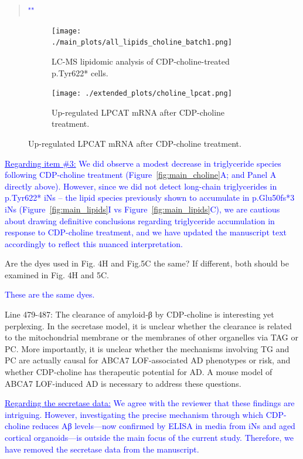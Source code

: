 \documentclass[12pt]{article}
\begin{document}
\begin{quote}
	\textcolor{blue}{"\quoteI"}
\end{quote}

\begin{figure}[H] 
\begin{subfigure}[t]{0.6\textwidth}
		\caption{LC-MS lipidomic analysis of CDP-choline-treated p.Tyr622* cells.}
		\texttt{[image: ./main\_plots/all\_lipids\_choline\_batch1.png]}        
	\end{subfigure}
	\begin{subfigure}[t]{0.4\textwidth}
		\caption{Up-regulated LPCAT mRNA after CDP-choline treatment.}
		\texttt{[image: ./extended\_plots/choline\_lpcat.png]}        
	\end{subfigure}
\end{figure}

\textcolor{blue}{\underline{Regarding item \#3:} We did  observe a modest decrease in triglyceride species following CDP-choline treatment (Figure~\ref{fig:main_choline}A; and Panel A directly above). However, since we did not detect  long-chain triglycerides in p.Tyr622* iNs – the lipid species previously shown to accumulate in p.Glu50fs*3 iNs (Figure~\ref{fig:main_lipids}I vs Figure~\ref{fig:main_lipids}C), we are cautious about drawing definitive conclusions regarding triglyceride accumulation in response to CDP-choline treatment, and we have updated the manuscript text accordingly to reflect this nuanced interpretation.}

Are the dyes used in Fig. 4H and Fig.5C the same? If different, both should be examined in Fig. 4H and 5C.

\textcolor{blue}{These are the same dyes.}

Line 479-487: The clearance of amyloid-β by CDP-choline is interesting yet perplexing. In the secretase model, it is unclear whether the clearance is related to the mitochondrial membrane or the membranes of other organelles via TAG or PC. More importantly, it is unclear whether the mechanisms involving TG and PC are actually causal for ABCA7 LOF-associated AD phenotypes or risk, and whether CDP-choline has therapeutic potential for AD. A mouse model of ABCA7 LOF-induced AD is necessary to address these questions.

\textcolor{blue}{\underline{Regarding the secretase data:} We agree with the reviewer that these findings are intriguing. However, investigating the precise mechanism through which CDP-choline reduces Aβ levels—now confirmed by ELISA in media from iNs and aged cortical organoids—is outside the main focus of the current study. Therefore, we have removed the secretase data from the manuscript.}
\end{document}
